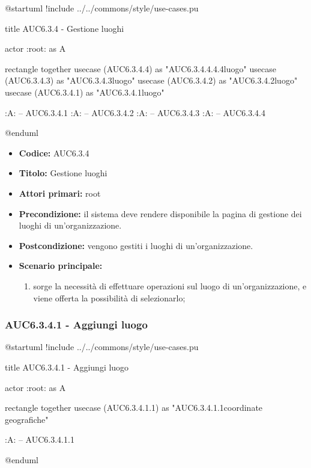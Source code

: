 \documentclass[casi-duso]{subfiles}
\begin{document}
\begin{plantuml}
@startuml
!include ../../commons/style/use-cases.pu

title AUC6.3.4 - Gestione luoghi

actor :root: as A

rectangle {
  together {
    usecase (AUC6.3.4.4) as "AUC6.3.4.4.4.4\nSeleziona luogo"
    usecase (AUC6.3.4.3) as "AUC6.3.4.3\nModifica luogo"
    usecase (AUC6.3.4.2) as "AUC6.3.4.2\nEliminazione luogo"
    usecase (AUC6.3.4.1) as "AUC6.3.4.1\nAggiungi luogo"
  }
}

:A: -- AUC6.3.4.1
:A: -- AUC6.3.4.2
:A: -- AUC6.3.4.3
:A: -- AUC6.3.4.4

@enduml
\end{plantuml}

\begin{itemize}
  \item \textbf{Codice:} AUC6.3.4
  \item \textbf{Titolo:} Gestione luoghi
  \item \textbf{Attori primari:} root
  \item \textbf{Precondizione:} il sistema deve rendere disponibile la pagina di gestione dei luoghi di un'organizzazione.
  \item \textbf{Postcondizione:} vengono gestiti i luoghi di un'organizzazione.
  \item \textbf{Scenario principale:}
  \begin{enumerate}
    \item sorge la necessità di effettuare operazioni sul luogo di un'organizzazione, e viene offerta la possibilità di selezionarlo;
  \end{enumerate}
\end{itemize}

\subsubsection{AUC6.3.4.1 - Aggiungi luogo}%
\label{subsub:AUC6.3.4.1}

\begin{plantuml}
@startuml 
!include ../../commons/style/use-cases.pu

title AUC6.3.4.1 - Aggiungi luogo

actor :root: as A

rectangle {
  together {
    usecase (AUC6.3.4.1.1) as "AUC6.3.4.1.1\nInserisci coordinate geografiche"
  }
}

:A: -- AUC6.3.4.1.1

@enduml
\end{plantuml}
\end{document}
